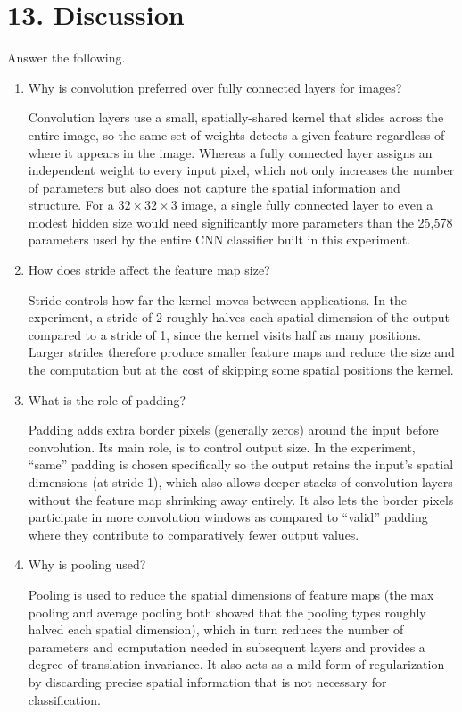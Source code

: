 \documentclass[11pt]{article}
\begin{document}
\section*{13. Discussion}

Answer the following.

\begin{enumerate}
\item Why is convolution preferred over fully connected layers for images?

Convolution layers use a small, spatially-shared kernel that slides across the entire image, so the same set of weights detects a given feature regardless of where it appears in the image. Whereas a fully connected layer assigns an independent weight to every input pixel, which not only increases the number of parameters but also does not capture the spatial information and structure. For a $32\times32\times3$ image, a single fully connected layer to even a modest hidden size would need significantly more parameters than the 25,578 parameters used by the entire CNN classifier built in this experiment.

\item How does stride affect the feature map size?

Stride controls how far the kernel moves between applications. In the experiment, a stride of 2 roughly halves each spatial dimension of the output compared to a stride of 1, since the kernel visits half as many positions. Larger strides therefore produce smaller feature maps and reduce the size and the computation but at the cost of skipping some spatial positions the kernel.

\item What is the role of padding?

Padding adds extra border pixels (generally zeros) around the input before convolution. Its main role, is to control output size. In the experiment, ``same'' padding is chosen specifically so the output retains the input's spatial dimensions (at stride 1), which also allows deeper stacks of convolution layers without the feature map shrinking away entirely. It also lets the border pixels participate in more convolution windows as compared to ``valid'' padding where they contribute to comparatively fewer output values.

\item Why is pooling used?

Pooling is used to reduce the spatial dimensions of feature maps (the max pooling and average pooling both showed that the pooling types roughly halved each spatial dimension), which in turn reduces the number of parameters and computation needed in subsequent layers and provides a degree of translation invariance. It also acts as a mild form of regularization by discarding precise spatial information that is not necessary for classification.


\end{enumerate}
\end{document}
